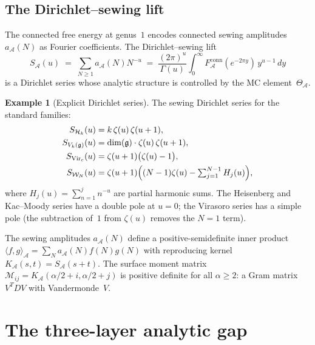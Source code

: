 \documentclass[11pt,reqno]{amsart}
\theoremstyle{definition}
\newtheorem{example}[theorem]{Example}
\theoremstyle{remark}
\newcommand{\cA}{\mathcal{A}}
\newcommand{\cH}{\mathcal{H}}
\newcommand{\cW}{\mathcal{W}}
\newcommand{\Vir}{\mathrm{Vir}}
\newcommand{\fg}{\mathfrak{g}}
\newcommand{\GG}{\Gamma}
\numberwithin{equation}{section}
\begin{document}
\subsection{The Dirichlet--sewing lift}\label{subsec:dirichlet-lift}

The connected free energy at genus~$1$ encodes connected
sewing amplitudes $a_\cA(N)$ as Fourier coefficients.  The
Dirichlet--sewing lift
\begin{equation}\label{eq:dirichlet-sewing}
S_\cA(u)
\;=\;
\sum_{N \geq 1} a_\cA(N) N^{-u}
\;=\;
\frac{(2\pi)^u}{\GG(u)}
\int_0^\infty F_\cA^{\mathrm{conn}}(e^{-2\pi y})\,
y^{u-1}\,dy
\end{equation}
is a Dirichlet series whose analytic structure is controlled by
the MC element~$\Theta_\cA$.

\begin{example}[Explicit Dirichlet series]
\label{ex:dirichlet-explicit}
The sewing Dirichlet series for the standard families:
\begin{align}
S_{\cH_k}(u) &= k\,\zeta(u)\,\zeta(u+1),
\label{eq:dirichlet-heisenberg}\\
S_{V_k(\fg)}(u) &= \dim(\fg)\cdot\zeta(u)\,\zeta(u+1),
\label{eq:dirichlet-km}\\
S_{\Vir_c}(u) &= \zeta(u+1)\bigl(\zeta(u) - 1\bigr),
\label{eq:dirichlet-virasoro}\\
S_{\cW_N}(u) &= \zeta(u+1)\Bigl((N-1)\zeta(u)
- \textstyle\sum_{j=1}^{N-1} H_j(u)\Bigr),
\label{eq:dirichlet-wn}
\end{align}
where $H_j(u) = \sum_{n=1}^j n^{-u}$ are partial harmonic
sums.  The Heisenberg and Kac--Moody series have a double pole
at $u = 0$; the Virasoro series has a simple pole (the
subtraction of~$1$ from $\zeta(u)$ removes the $N = 1$ term).
\end{example}

The sewing amplitudes $a_\cA(N)$ define a positive-semidefinite
inner product
$\langle f, g\rangle_\cA
= \sum_N a_\cA(N) f(N) g(N)$
with reproducing kernel
$K_\cA(s,t) = S_\cA(s+t)$.  The surface moment matrix
$\mathscr{M}_{ij}
= K_\cA(\alpha/2 + i, \alpha/2 + j)$
is positive definite for all $\alpha \geq 2$: a Gram matrix
$V^T D V$ with Vandermonde~$V$.



\section{The three-layer analytic gap}\label{sec:gap}
\end{document}
